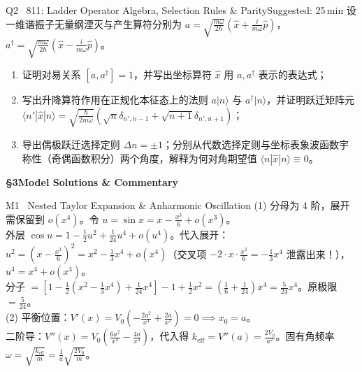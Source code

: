 \documentclass[a4paper,11pt]{article}
\begin{document}
\begin{problem}{Q2 \textbar\ 811: Ladder Operator Algebra, Selection Rules \& Parity}{Suggested: 25\,min}
设一维谐振子无量纲湮灭与产生算符分别为 $a = \sqrt{\frac{m\omega}{2\hbar}}(\hat{x} + \frac{i}{m\omega}\hat{p})$，$a^\dagger = \sqrt{\frac{m\omega}{2\hbar}}(\hat{x} - \frac{i}{m\omega}\hat{p})$。
\begin{enumerate}[leftmargin=1.5em,itemsep=0.5pt,topsep=1pt]
  \item 证明对易关系 $[a, a^\dagger] = 1$，并写出坐标算符 $\hat{x}$ 用 $a, a^\dagger$ 表示的表达式；
  \item 写出升降算符作用在正规化本征态上的法则 $a|n\rangle$ 与 $a^\dagger|n\rangle$，并证明跃迁矩阵元 $\langle n'|\hat{x}|n\rangle = \sqrt{\frac{\hbar}{2m\omega}}(\sqrt{n}\delta_{n', n-1} + \sqrt{n+1}\delta_{n', n+1})$；
  \item 导出偶极跃迁选择定则 $\Delta n = \pm 1$；分别从代数选择定则与坐标表象波函数宇称性（奇偶函数积分）两个角度，解释为何对角期望值 $\langle n|\hat{x}|n\rangle \equiv 0$。
\end{enumerate}
\end{problem}

\clearpage

{\Large\sffamily\bfseries\color{navy} \S 3\quad Model Solutions \& Commentary}

\vspace{2pt}

\begin{solution}{M1 \textperiodcentered\ Nested Taylor Expansion \& Anharmonic Oscillation}
\small
(1) 分母为 4 阶，展开需保留到 $o(x^4)$。令 $u = \sin x = x - \frac{x^3}{6} + o(x^3)$。\\
外层 $\cos u = 1 - \frac{1}{2}u^2 + \frac{1}{24}u^4 + o(u^4)$。代入展开：\\
$u^2 = \left(x - \frac{x^3}{6}\right)^2 = x^2 - \frac{1}{3}x^4 + o(x^4)$（交叉项 $-2\cdot x \cdot \frac{x^3}{6} = -\frac{1}{3}x^4$ 泄露出来！），$u^4 = x^4 + o(x^4)$。\\
分子 $= \left[1 - \frac{1}{2}(x^2 - \frac{1}{3}x^4) + \frac{1}{24}x^4\right] - 1 + \frac{1}{2}x^2 = (\frac{1}{6} + \frac{1}{24})x^4 = \frac{5}{24}x^4$。原极限 $= \frac{5}{24}$。\\
(2) 平衡位置：$V'(x) = V_0(-\frac{2a^2}{x^3} + \frac{2a}{x^2}) = 0 \implies x_0 = a$。\\
二阶导：$V''(x) = V_0(\frac{6a^2}{x^4} - \frac{4a}{x^3})$，代入得 $k_{\text{eff}} = V''(a) = \frac{2V_0}{a^2}$。固有角频率 $\omega = \sqrt{\frac{k_{\text{eff}}}{m}} = \frac{1}{a}\sqrt{\frac{2V_0}{m}}$。
\end{solution}
\end{document}
